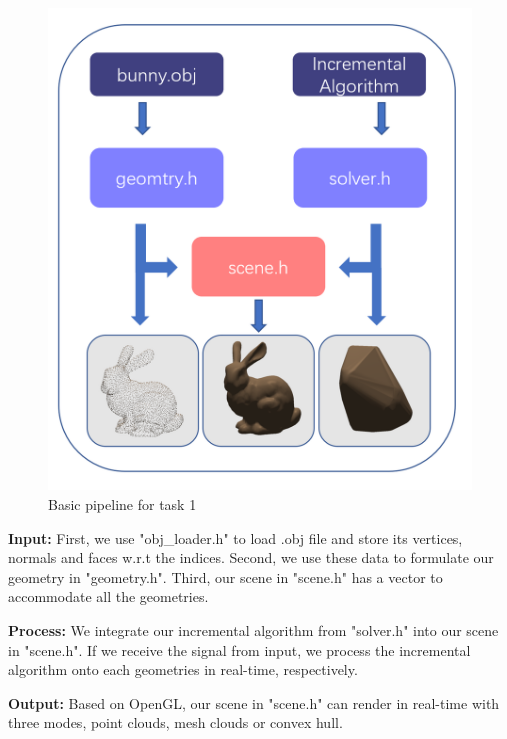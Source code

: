 \documentclass[acmtog]{acmart}
\begin{document}
\begin{figure}[h]
	\centering
	\includegraphics[scale=0.15]{pipeline1.png}
	\caption{Basic pipeline for task 1}
	\label{fig:img1}
\end{figure}
	
	\quad \textbf{Input:} First, we use "obj\_loader.h" to load .obj file and store its vertices, normals and faces w.r.t the indices. Second, we use these data to formulate our geometry in "geometry.h". Third, our scene in "scene.h" has a vector to accommodate all the geometries.
	
	\quad \textbf{Process:} We integrate our incremental algorithm from "solver.h" into our scene in "scene.h". If we receive the signal from input, we process the incremental algorithm onto each geometries in real-time, respectively. 
	
	\quad \textbf{Output:} Based on OpenGL, our scene in "scene.h" can render  in real-time with three modes, point clouds, mesh clouds or convex hull.
	
\end{document}

